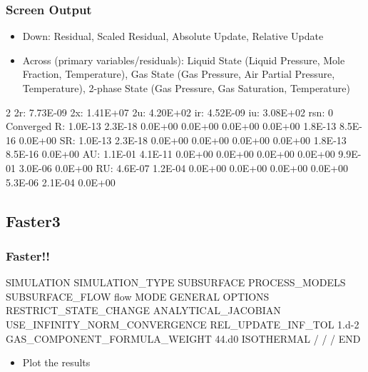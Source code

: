 \documentclass{beamer}
\newcommand\bluecomment[1]{{{\color{blue} #1}}}
\begin{document}
\begin{frame}[fragile]\frametitle{Screen Output}

\begin{itemize}
\item \bluecomment{Down:} Residual, Scaled Residual, Absolute Update, Relative Update
\item \bluecomment{Across (primary variables/residuals):} Liquid State (Liquid Pressure, Mole Fraction, Temperature), Gas State (Gas Pressure, Air Partial Pressure, Temperature), 2-phase State (Gas Pressure, Gas Saturation, Temperature)
\end{itemize}

\begin{semiverbatim}
\scriptsize
2 2r: 7.73E-09 2x: 1.41E+07 2u: 4.20E+02 ir: 4.52E-09 iu: 3.08E+02 rsn:   0
   Converged
     R: 1.0E-13 2.3E-18 0.0E+00 0.0E+00 0.0E+00 0.0E+00 1.8E-13 8.5E-16 0.0E+00
    SR: 1.0E-13 2.3E-18 0.0E+00 0.0E+00 0.0E+00 0.0E+00 1.8E-13 8.5E-16 0.0E+00
    AU: 1.1E-01 4.1E-11 0.0E+00 0.0E+00 0.0E+00 0.0E+00 9.9E-01 3.0E-06 0.0E+00
    RU: 4.6E-07 1.2E-04 0.0E+00 0.0E+00 0.0E+00 0.0E+00 5.3E-06 2.1E-04 0.0E+00
\end{semiverbatim}

\end{frame}

\subsection{Faster3}
\begin{frame}[fragile]\frametitle{Faster!!}

\begin{semiverbatim}
SIMULATION
  SIMULATION_TYPE SUBSURFACE
  PROCESS_MODELS
    SUBSURFACE_FLOW flow
      MODE GENERAL 
      OPTIONS
        RESTRICT_STATE_CHANGE
        ANALYTICAL_JACOBIAN
        USE_INFINITY_NORM_CONVERGENCE
        REL_UPDATE_INF_TOL 1.d-2
        GAS_COMPONENT_FORMULA_WEIGHT 44.d0  
        ISOTHERMAL 
      /
    /
  /
END
\end{semiverbatim}

\begin{itemize}
  \item Plot the results
\end{itemize}

\end{frame}
\end{document}
